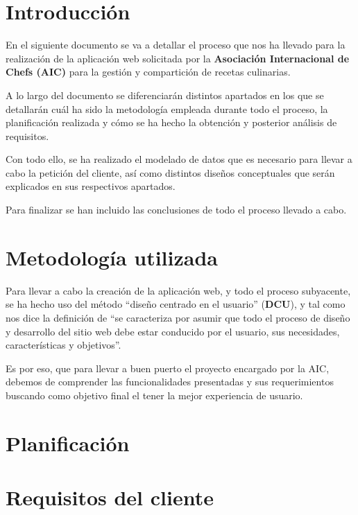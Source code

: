 \documentclass{\ClassPath/viu-tfm-template}
\begin{document}
    \graphicspath{{../VIU_TFM_LaTeX_template/}}

    \coverpage

    \tableofcontents

\chapter{Introducción}
En el siguiente documento se va a detallar el proceso que nos ha llevado para la realización de la aplicación web solicitada por la  \textbf{Asociación Internacional de Chefs (AIC)} para la gestión y compartición de recetas culinarias.

A lo largo del documento se diferenciarán distintos apartados en los que se detallarán cuál ha sido la metodología empleada durante todo el proceso, la planificación realizada y cómo se ha hecho la obtención y posterior análisis de requisitos.

Con todo ello, se ha realizado el modelado de datos que es necesario para llevar a cabo la petición del cliente, así como distintos diseños conceptuales que serán explicados en sus respectivos apartados.

Para finalizar se han incluido las conclusiones de todo el proceso llevado a cabo.


\chapter{Metodología utilizada}
Para llevar a cabo la creación de la aplicación web, y todo el proceso subyacente, se ha hecho uso del método “diseño centrado en el usuario” (\textbf{DCU}), y tal como nos dice la definición de \textcite{hassan2004diseno} “se caracteriza por asumir que todo el proceso de diseño y desarrollo del sitio web debe estar conducido por el usuario, sus necesidades, características y objetivos”.

Es por eso, que para llevar a buen puerto el proyecto encargado por la AIC, debemos de comprender las funcionalidades presentadas y sus requerimientos buscando como objetivo final el tener la mejor experiencia de usuario.

\chapter{Planificación}

\chapter{Requisitos del cliente}
\end{document}
